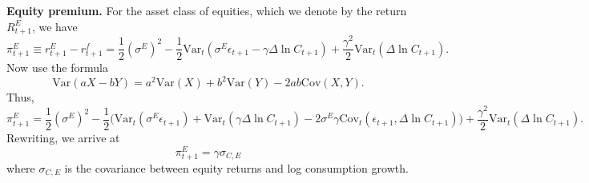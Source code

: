 \documentclass[11pt]{extarticle}
\theoremstyle{plain}
\theoremstyle{definition}
\begin{document}
\begin{enumerate}[(a)]
\vspace{5mm}
\noindent
\textbf{Equity premium.} For the asset class of equities, which we denote by the return $R_{t+1}^E$, we have 
\begin{equation*}
	\pi_{t+1}^E \equiv r_{t+1}^E - r_{t+1}^f = \frac{1}{2} (\sigma^E)^2 - \frac{1}{2} \text{Var}_t( \sigma^E \epsilon_{t+1} - \gamma \Delta \ln C_{t+1}) + \frac{\gamma^2}{2} \text{Var}_t( \Delta \ln C_{t+1}).
\end{equation*}
Now use the formula 
\begin{equation*}
	\text{Var}(aX-bY) = a^2 \text{Var}(X) + b^2 \text{Var}(Y) - 2ab \text{Cov}(X,Y).
\end{equation*}
Thus, 
\begin{equation*}
	\pi_{t+1}^E = \frac{1}{2} (\sigma^E)^2 - \frac{1}{2} \bigg(\text{Var}_t( \sigma^E \epsilon_{t+1}) + \text{Var}_t(\gamma \Delta \ln C_{t+1}) - 2 \sigma^E \gamma \text{Cov}_t(\epsilon_{t+1}, \Delta \ln C_{t+1}) \bigg) + \frac{\gamma^2}{2} \text{Var}_t( \Delta \ln C_{t+1}).
\end{equation*}
Rewriting, we arrive at 
\begin{equation}
	\pi_{t+1}^E = \gamma \sigma_{C,E}
\end{equation}
where $\sigma_{C,E}$ is the covariance between equity returns and log consumption growth. 

\end{enumerate}
\end{document}
